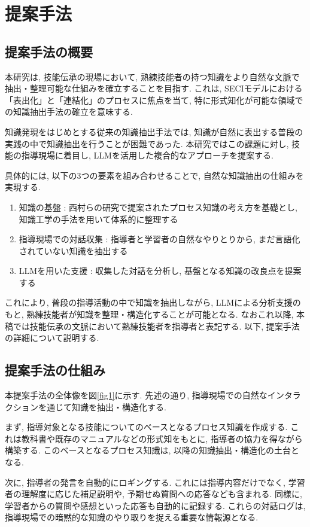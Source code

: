 \chapter{提案手法}
\section{提案手法の概要}
本研究は, 技能伝承の現場において, 熟練技能者の持つ知識をより自然な文脈で抽出・整理可能な仕組みを確立することを目指す. これは, SECIモデルにおける「表出化」と「連結化」のプロセスに焦点を当て, 特に形式知化が可能な領域での知識抽出手法の確立を意味する.

知識発現\cite{Nishimura2017}をはじめとする従来の知識抽出手法では, 知識が自然に表出する普段の実践の中で知識抽出を行うことが困難であった. 本研究ではこの課題に対し, 技能の指導現場に着目し, LLMを活用した複合的なアプローチを提案する. 

具体的には, 以下の3つの要素を組み合わせることで, 自然な知識抽出の仕組みを実現する.
\begin{enumerate}
    \item 知識の基盤 : 西村らの研究で提案されたプロセス知識の考え方を基礎とし, 知識工学の手法を用いて体系的に整理する
    \item 指導現場での対話収集 : 指導者と学習者の自然なやりとりから, まだ言語化されていない知識を抽出する
    \item LLMを用いた支援 : 収集した対話を分析し, 基盤となる知識の改良点を提案する
\end{enumerate}

これにより, 普段の指導活動の中で知識を抽出しながら, LLMによる分析支援のもと, 熟練技能者が知識を整理・構造化することが可能となる. なおこれ以降, 本稿では技能伝承の文脈において熟練技能者を指導者と表記する. 以下, 提案手法の詳細について説明する.

\section{提案手法の仕組み}
本提案手法の全体像を図\ref{fig1}に示す. 先述の通り, 指導現場での自然なインタラクションを通じて知識を抽出・構造化する.

まず, 指導対象となる技能についてのベースとなるプロセス知識を作成する. これは教科書や既存のマニュアルなどの形式知をもとに, 指導者の協力を得ながら構築する. このベースとなるプロセス知識は, 以降の知識抽出・構造化の土台となる. 

次に, 指導者の発言を自動的にロギングする. これには指導内容だけでなく, 学習者の理解度に応じた補足説明や, 予期せぬ質問への応答なども含まれる. 同様に, 学習者からの質問や感想といった応答も自動的に記録する. これらの対話ログは, 指導現場での暗黙的な知識のやり取りを捉える重要な情報源となる. 

